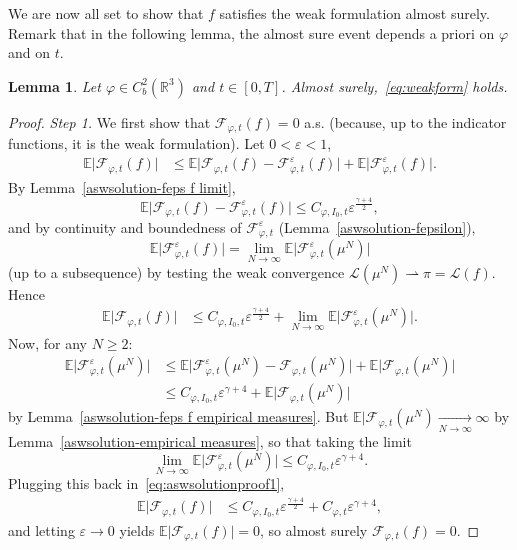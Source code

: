 \documentclass[11pt,a4paper]{article}
\theoremstyle{definition}
\theoremstyle{plain}
\newtheorem{lemma}[defi]{Lemma}
\begin{document}
We are now all set to show that $f$ satisfies the weak formulation almost surely. Remark that in the following lemma, the almost sure event depends a priori on $\varphi$ and on $t$.
\begin{lemma}
\label{aswsolution:weakformholds}
    Let $\varphi\in C^2_b(\mathbb{R}^3)$ and $t\in[0,T]$.
    Almost surely,~\eqref{eq:weakform} holds.
\end{lemma}
\begin{proof}
    \textit{Step 1.} We first show that $\mathcal{F}_{\varphi,t}(f)=0$ a.s. (because, up to the indicator functions, it is the weak formulation).
    Let $0<\varepsilon<1$,
    \begin{align*}
        \mathbb{E}\vert \mathcal{F}_{\varphi,t}(f) \vert &\leq \mathbb{E}\vert \mathcal{F}_{\varphi,t}(f) -\mathcal{F}_{\varphi,t}^\varepsilon(f) \vert +\mathbb{E}\vert  \mathcal{F}_{\varphi,t}^\varepsilon(f)\vert.
    \end{align*}
    By Lemma~\ref{aswsolution-feps f limit},
    $$\mathbb{E}\vert \mathcal{F}_{\varphi,t}(f) -\mathcal{F}_{\varphi,t}^\varepsilon(f) \vert  \leq C_{\varphi,I_0,t}\varepsilon^{\frac{\gamma+4}{2}}, $$
    and by continuity and boundedness of $\mathcal{F}_{\varphi,t}^\varepsilon$ (Lemma~\ref{aswsolution-fepsilon}),
    $$\mathbb{E}\vert  \mathcal{F}_{\varphi,t}^\varepsilon(f)\vert = \lim_{N\rightarrow \infty}\mathbb{E}\vert  \mathcal{F}_{\varphi,t}^\varepsilon(\mu^N)\vert$$
    (up to a subsequence) by testing the weak convergence $\mathcal{L}(\mu^N)\rightharpoonup \pi=\mathcal{L}(f)$. Hence
    \begin{align}
    \label{eq:aswsolutionproof1}
        \mathbb{E}\vert \mathcal{F}_{\varphi,t}(f) \vert &\leq C_{\varphi,I_0,t}\varepsilon^{\frac{\gamma+4}{2}}+\lim_{N\rightarrow \infty}\mathbb{E}\vert  \mathcal{F}_{\varphi,t}^\varepsilon(\mu^N)\vert.
    \end{align}
    Now, for any $N\geq 2$:
    \begin{align*}
        \mathbb{E}\vert \mathcal{F}_{\varphi,t}^\varepsilon(\mu^N) \vert &\leq \mathbb{E}\vert  \mathcal{F}_{\varphi,t}^\varepsilon(\mu^N)-\mathcal{F}_{\varphi,t}(\mu^N)\vert+\mathbb{E}\vert  \mathcal{F}_{\varphi,t}(\mu^N)\vert \\
        &\leq C_{\varphi,I_0,t}\varepsilon^{\gamma+4}+\mathbb{E}\vert  \mathcal{F}_{\varphi,t}(\mu^N)\vert
    \end{align*}
    by Lemma~\ref{aswsolution-feps f empirical measures}. But $\mathbb{E}\vert  \mathcal{F}_{\varphi,t}(\mu^N)\xrightarrow[N\rightarrow\infty]{} \infty$ by Lemma~\ref{aswsolution-empirical measures}, so that taking the limit
    $$\lim_{N\rightarrow \infty}\mathbb{E}\vert  \mathcal{F}_{\varphi,t}^\varepsilon(\mu^N)\vert\leq C_{\varphi,I_0,t}\varepsilon^{\gamma+4}.$$
    Plugging this back in~\eqref{eq:aswsolutionproof1},
    \begin{align*}
        \mathbb{E}\vert \mathcal{F}_{\varphi,t}(f) \vert &\leq C_{\varphi,I_0,t}\varepsilon^{\frac{\gamma+4}{2}}+C_{\varphi,t}\varepsilon^{\gamma+4},
    \end{align*}
    and letting $\varepsilon\rightarrow 0$ yields $\mathbb{E}\vert \mathcal{F}_{\varphi,t}(f) \vert=0$, so almost surely $\mathcal{F}_{\varphi,t}(f)=0$.


\end{proof}
\end{document}
